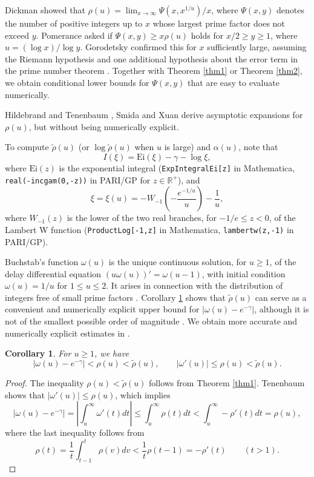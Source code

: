 \documentclass[11pt]{amsart}
\newtheorem{corollary}{Corollary}
\begin{document}
Dickman \cite{Dick} showed that  $\rho(u)=\lim_{x\to \infty} \Psi(x,x^{1/u})/x$, where
$\Psi(x,y)$ denotes the number of positive integers up to $x$ whose largest prime factor does not exceed $y$.
Pomerance \cite[(1.25)]{Gran} asked if $\Psi(x,y)\ge x\rho(u)$ holds for $x/2\ge y\ge 1$, where $u=(\log x)/\log y$.
Gorodetsky \cite{Gor} confirmed this for $x$ sufficiently large, assuming the Riemann hypothesis and 
one additional hypothesis about the error term in the prime number theorem \cite[(1.7)]{Gor}.
Together with Theorem \ref{thm1} or Theorem \ref{thm2}, we obtain conditional lower bounds for
$\Psi(x,y)$ that are easy to evaluate numerically.


Hildebrand and Tenenbaum \cite{HT}, Smida \cite{Smida} and Xuan \cite{Xuan} derive asymptotic expansions for $\rho(u)$, but without being numerically explicit.


To compute $\tilde{\rho}(u)$ (or $\log \tilde{\rho}(u)$ when $u$ is large) and $\alpha(u)$, note that
$$
I(\xi)=\mathrm{Ei}(\xi)-\gamma - \log \xi,
$$
where $\mathrm{Ei}(z)$ is the exponential integral (\texttt{ExpIntegralEi[z]} in Mathematica, \texttt{real(-incgam(0,-z))} in PARI/GP for $z\in \mathbb{R}^+$), 
and
\begin{equation*}\label{eqximat}
\xi = \xi(u) =-W_{-1}\left(-\frac{e^{-1/u}}{u}\right)-\frac{1}{u},
\end{equation*}
where $W_{-1}(z)$ is the lower of the two real branches, for $-1/e\le z<0$,
of the Lambert W function (\texttt{ProductLog[-1,z]} in Mathematica, \texttt{lambertw(z,-1)} in PARI/GP).

Buchstab's function $\omega(u)$ is the unique continuous solution, for $u\ge 1$, of the delay differential equation
$(u\omega(u))'=\omega(u-1)$, with initial condition $\omega(u)=1/u$ for $1\le u \le 2$. 
It arises in connection with the distribution of integers free of small prime factors \cite[Ch.~III.6]{Ten}.
Corollary \ref{cor1} shows that $\tilde{\rho}(u)$ 
can serve as a convenient and numerically explicit upper bound for $|\omega(u)-e^{-\gamma}|$,
although it is not of the smallest possible order of magnitude \cite{Hil}. 
We obtain more accurate and numerically explicit estimates in \cite{WeinB}.

\begin{corollary}\label{cor1}
For $u\ge 1 $, we have 
$$
|\omega(u)-e^{-\gamma}| < \rho(u) < \tilde{\rho}(u),
\qquad
|\omega'(u)| \le  \rho(u) < \tilde{\rho}(u).
$$
\end{corollary}

\begin{proof}
The inequality $\rho(u)<\tilde{\rho}(u)$ follows from Theorem \ref{thm1}. 
Tenenbaum \cite[Thm.~III.6.6]{Ten} shows that $|\omega'(u)|\le \rho(u)$,
which implies 
$$|\omega(u)-e^{-\gamma}| = |\int_u^\infty \omega'(t) dt |\le \int_u^\infty \rho(t) dt < \int_u^\infty -\rho'(t) dt =\rho(u),$$
where the last inequality follows from
$$
\rho(t) = \frac{1}{t} \int_{t-1}^t \rho(v) dv < \frac{1}{t} \rho(t-1) = -\rho'(t) \qquad (t>1).
$$
\end{proof}
\end{document}
